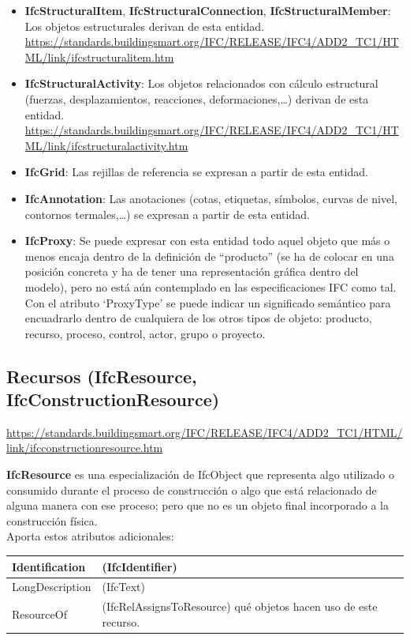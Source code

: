 \documentclass[spanish,12pt,a4paper,final,oneside]{book}
\begin{document}
\begin{itemize}
\item \textbf{IfcStructuralItem}, \textbf{IfcStructuralConnection}, \textbf{IfcStructuralMember}: Los objetos estructurales derivan de esta entidad.
\\ \url{https://standards.buildingsmart.org/IFC/RELEASE/IFC4/ADD2_TC1/HTML/link/ifcstructuralitem.htm}

\item \textbf{IfcStructuralActivity}: Los objetos relacionados con cálculo estructural (fuerzas, desplazamientos, reacciones, deformaciones,\ldots) derivan de esta entidad.
\\ \url{https://standards.buildingsmart.org/IFC/RELEASE/IFC4/ADD2_TC1/HTML/link/ifcstructuralactivity.htm}

\item \textbf{IfcGrid}: Las rejillas de referencia se expresan a partir de esta entidad.

\item \textbf{IfcAnnotation}: Las anotaciones (cotas, etiquetas, símbolos, curvas de nivel, contornos termales,\ldots) se expresan a partir de esta entidad.

\item \textbf{IfcProxy}: Se puede expresar con esta entidad todo aquel objeto que más o menos encaja dentro de la definición de ``producto'' (se ha de colocar en una posición concreta y ha de tener una representación gráfica dentro del modelo), pero no está aún contemplado en las especificaciones IFC como tal. 
\\Con el atributo `ProxyType' se puede indicar un significado semántico para encuadrarlo dentro de cualquiera de los otros tipos de objeto: producto, recurso, proceso, control, actor, grupo o proyecto.

\end{itemize}



\subsection{Recursos (IfcResource, IfcConstructionResource)}
\url{https://standards.buildingsmart.org/IFC/RELEASE/IFC4/ADD2_TC1/HTML/link/ifcconstructionresource.htm}

\textbf{IfcResource} es una especialización de IfcObject que representa algo utilizado o consumido durante el proceso de construcción o algo que está relacionado de alguna manera con ese proceso; pero que no es un objeto final incorporado a la construcción física.
\\Aporta estos atributos adicionales:
\\ \begin{longtable}{|p{2.5cm} p{11cm}|}
\hline

Identification & (IfcIdentifier)
\\[0.1cm] \hline

LongDescription & (IfcText)
\\[0.1cm] \hline

ResourceOf & (IfcRelAssignsToResource) qué objetos hacen uso de este recurso.
\\[0.1cm] \hline

\end{longtable}
\end{document}
